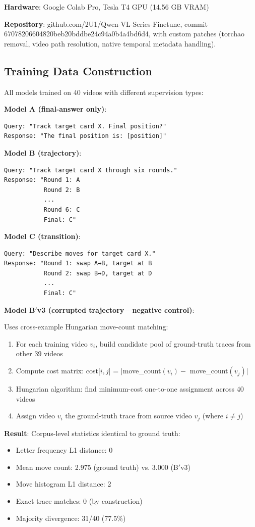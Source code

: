 \textbf{Hardware}: Google Colab Pro, Tesla T4 GPU (14.56 GB VRAM)

\textbf{Repository}: github.com/2U1/Qwen-VL-Series-Finetune, commit 67078206604820beb20bddbe24c94a0b4a4bd6d4, with custom patches (torchao removal, video path resolution, native temporal metadata handling).

\subsection{Training Data Construction}

All models trained on 40 videos with different supervision types:

\textbf{Model A (final-answer only)}:
\begin{verbatim}
Query: "Track target card X. Final position?"
Response: "The final position is: [position]"
\end{verbatim}

\textbf{Model B (trajectory)}:
\begin{verbatim}
Query: "Track target card X through six rounds."
Response: "Round 1: A
           Round 2: B
           ...
           Round 6: C
           Final: C"
\end{verbatim}

\textbf{Model C (transition)}:
\begin{verbatim}
Query: "Describe moves for target card X."
Response: "Round 1: swap A↔B, target at B
           Round 2: swap B↔D, target at D
           ...
           Final: C"
\end{verbatim}

\textbf{Model B$'$v3 (corrupted trajectory---negative control)}:

Uses cross-example Hungarian move-count matching:
\begin{enumerate}
    \item For each training video $v_i$, build candidate pool of ground-truth traces from other 39 videos
    \item Compute cost matrix: cost[$i,j$] = $|$move\_count$(v_i) -$ move\_count$(v_j)|$
    \item Hungarian algorithm: find minimum-cost one-to-one assignment across 40 videos
    \item Assign video $v_i$ the ground-truth trace from source video $v_j$ (where $i \neq j$)
\end{enumerate}

\textbf{Result}: Corpus-level statistics identical to ground truth:
\begin{itemize}
    \item Letter frequency L1 distance: 0
    \item Mean move count: 2.975 (ground truth) vs. 3.000 (B$'$v3)
    \item Move histogram L1 distance: 2
    \item Exact trace matches: 0 (by construction)
    \item Majority divergence: 31/40 (77.5\%)
\end{itemize}

